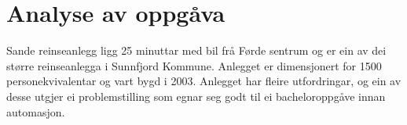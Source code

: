 \chapter{Analyse av oppgåva}
\thispagestyle{fancy}
Sande reinseanlegg ligg 25 minuttar med bil frå Førde sentrum og er ein 
av dei større reinseanlegga i \gls{Sunnfjord Kommune}. Anlegget er dimensjonert for 1500 personekvivalentar
og vart bygd i 2003. Anlegget har fleire utfordringar, og ein av desse utgjer ei problemstilling som egnar seg godt til ei
bacheloroppgåve innan automasjon.